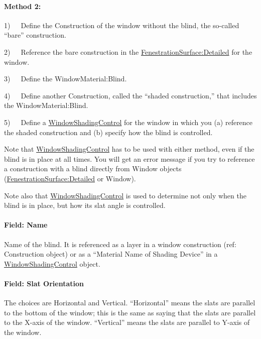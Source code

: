 \paragraph{Method 2:}\label{method-2-1}

1)~~~Define the Construction of the window without the blind, the so-called ``bare'' construction.

2)~~~Reference the bare construction in the \hyperref[fenestrationsurfacedetailed]{FenestrationSurface:Detailed} for the window.

3)~~~Define the WindowMaterial:Blind.

4)~~~Define another Construction, called the ``shaded construction,'' that includes the WindowMaterial:Blind.

5)~~~Define a \hyperref[windowpropertyshadingcontrol]{WindowShadingControl} for the window in which you (a) reference the shaded construction and (b) specify how the blind is controlled.

Note that \hyperref[windowpropertyshadingcontrol]{WindowShadingControl} has to be used with either method, even if the blind is in place at all times. You will get an error message if you try to reference a construction with a blind directly from Window objects (\hyperref[fenestrationsurfacedetailed]{FenestrationSurface:Detailed} or Window).

Note also that \hyperref[windowpropertyshadingcontrol]{WindowShadingControl} is used to determine not only when the blind is in place, but how its slat angle is controlled.

\paragraph{Field: Name}\label{field-name-17-007}

Name of the blind. It is referenced as a layer in a window construction (ref: Construction object) or as a ``Material Name of Shading Device'' in a \hyperref[windowpropertyshadingcontrol]{WindowShadingControl} object.

\paragraph{Field: Slat Orientation}\label{field-slat-orientation}

The choices are Horizontal and Vertical. ``Horizontal'' means the slats are parallel to the bottom of the window; this is the same as saying that the slats are parallel to the X-axis of the window. ``Vertical'' means the slats are parallel to Y-axis of the window.

